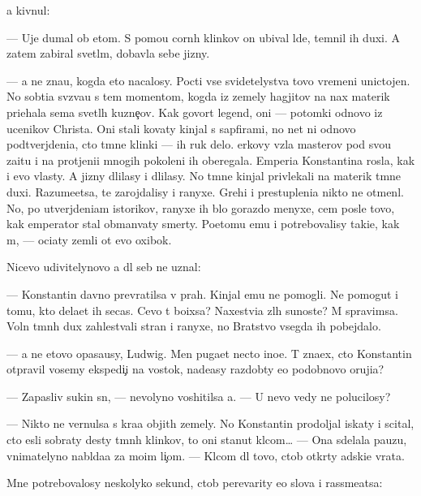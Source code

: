 \documentclass[10pt]{book}
\begin{document}
{\Y}a kivnul:

— Uje dumal ob etom. S pomo{\x}{\y}u corn{\yi}h klinkov on ubival l{\io}de{\y}, temnil ih duxi. A zatem zabiral svetl{\yi}m, dobavl{\ia}{\y}a sebe jizny.

— {\Y}a ne zna{\y}u, kogda eto nacalosy. Pocti vse svidetelystva tovo vremeni uni\-cto\-jen{\yi}. No sob{\yi}ti{\y}a sv{\ia}z{\yi}va{\y}u s tem momentom, kogda iz zemely hagjitov na nax materik pri{\y}ehala sem{\y}a svetl{\yi}h kuzne{\c}ov. Kak govor{\ia}t legend{\yi}, oni — potomki odnovo iz ucenikov Christa. Oni stali kovaty kinjal{\yi} s sapfirami, no net ni odnovo podtverjdeni{\y}a, cto t{\e}mn{\yi}{\y}e klinki — ih ruk delo. {\C}erkovy vz{\ia}la masterov pod svo{\y}u za{\x}itu i na prot{\ia}jeni{\y}i mnogih pokoleni{\y} ih oberegala. Emperi{\y}a Konstantina rosla, kak i {\y}evo vlas\-ty. A jizny dlilasy i dlilasy. No t{\e}mn{\yi}{\y}e kinjal{\yi} privlekali na materik t{\e}mn{\yi}{\y}e duxi. Razume{\y}etsa, te zarojdalisy i ranyxe. Grehi i prestupleni{\y}a nikto ne otmen{\ia}l. No, po utverjdeni{\y}am istorikov, ranyxe ih b{\yi}lo gorazdo menyxe, cem posle tovo, kak emperator stal obman{\yi}vaty smerty. Poetomu {\y}emu i potrebovalisy taki{\y}e, kak m{\yi}, — oci{\x}aty zemli ot {\y}evo oxibok.

Nicevo udivitelynovo {\y}a dl{\ia} seb{\ia} ne uznal:

— Konstantin davno prevratilsa v prah. Kinjal{\yi} {\y}emu ne pomogli. Ne pomogut i tomu, kto dela{\y}et ih se{\y}cas. Cevo t{\yi} bo{\y}ixsa? Naxestvi{\y}a zl{\yi}h su{\x}noste{\y}? M{\yi} spravimsa. Voln{\yi} t{\e}mn{\yi}h dux zahlest{\yi}vali stran{\yi} i ranyxe, no Bratstvo vsegda ih pobejdalo.

— {\Y}a ne etovo opasa{\y}usy, Ludwig. Men{\ia} puga{\y}et necto ino{\y}e. T{\yi} zna\-{\y}ex, cto Konstantin otpravil vosemy ekspedi{\c}i{\y} na vostok, nade{\y}asy razdob{\yi}ty {\y}e{\x}o podobnovo oruji{\y}a?

— Zapasliv{\yi}{\y} sukin s{\yi}n, — nevolyno voshitilsa {\y}a. — U nevo vedy ne polucilosy?

— Nikto ne vernulsa s kra{\y}a objit{\yi}h zemely. No Konstantin prodoljal iskaty i scital, cto {\y}esli sobraty des{\ia}ty t{\e}mn{\yi}h klinkov, to oni stanut kl{\io}com… — Ona sdelala pauzu, vnimatelyno nabl{\io}da{\y}a za mo{\y}im li{\c}om. — Kl{\io}com dl{\ia} tovo, ctob{\yi} otkr{\yi}ty adski{\y}e vra\-ta.

Mne potrebovalosy neskolyko sekund, ctob{\yi} perevarity {\y}e{\y}o slova i rassme{\y}atsa:
\end{document}
